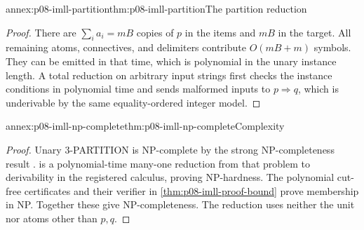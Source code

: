 \begin{annexitem}{annex:p08-imll-partition}{thm:p08-imll-partition}{The partition reduction}
\begin{proof}
There are \(\sum_i a_i=mB\) copies of \(p\) in the items and
\(mB\) in the target.  All remaining atoms, connectives, and delimiters
contribute \(O(mB+m)\) symbols.  They can be emitted in that time,
which is polynomial in the unary instance length.  A total reduction
on arbitrary input strings first checks the instance conditions in
polynomial time and sends malformed inputs to \(p\Rightarrow q\),
which is underivable by the same equality-ordered integer model.
\end{proof}
\end{annexitem}

\begin{annexitem}{annex:p08-imll-np-complete}{thm:p08-imll-np-complete}{Complexity}
\begin{proof}
Unary 3-PARTITION is NP-complete by the strong NP-completeness result
\parencite[Theorem~4.4]{GareyJohnson1979}.
 is a polynomial-time many-one reduction
from that problem to derivability in the registered calculus, proving
NP-hardness.  The polynomial cut-free certificates and their verifier
in \cref{thm:p08-imll-proof-bound} prove membership in NP.  Together
these give NP-completeness.  The reduction uses neither the unit nor
atoms other than \(p,q\).
\end{proof}
\end{annexitem}
